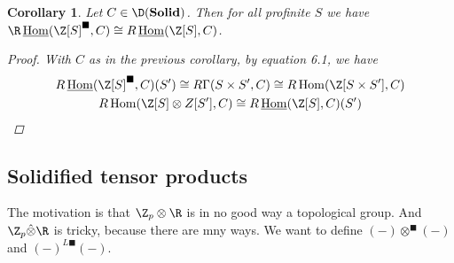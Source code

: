 \documentclass[A4paper, british]{amsart}
\theoremstyle{darkgreentheorem}
\newtheorem{cor}[thm]{Corollary}
\theoremstyle{darkbluedefinition}
\theoremstyle{darkredexample}
\theoremstyle{remark}
\DeclareMathOperator{\Hom}{Hom}
\DeclareMathOperator{\ihom}{\underline{Hom}}
\newcommand{\Solid}{\mathbf{Solid}}
\newcommand{\1}{\mathbbm{1}}
\newcommand{\ot}{\otimes}
\newcommand{\tms}{\times}
\newcommand{\solid}{^{\blacksquare}}
\newcommand{\dsolid}{^{L\blacksquare}}
\begin{document}
\begin{cor}
    Let $C\in \D(\Solid)$.
    Then for all profinite $S$ we have $\R\ihom(\Z[S]\solid,C)\cong R\ihom(\Z[S],C)$.
    \begin{proof}
	With $C$ as in the previous corollary, by equation 6.1, we have
	\begin{multline*}
	    R\ihom(\Z[S]\solid,C)(S')\cong R\Gamma(S\tms S',C)\cong R\Hom(\Z[S\tms S'],C) \\
	    R\Hom(\Z[S]\ot Z[S'],C)\cong R\ihom(\Z[S],C)(S')
	\end{multline*}
    \end{proof}
\end{cor}

\subsection{Solidified tensor products}

The motivation is that $\Z_{p}\ot \R$ is in no good way a topological group.
And $\Z_{p}\hat{\ot}\R$ is tricky, because there are mny ways.
We want to define $(-)\ot\solid (-)$ and $(-)\dsolid(-)$.
\end{document}
